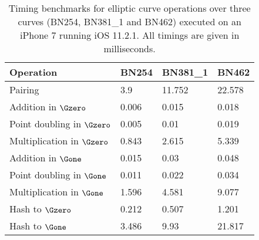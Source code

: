 
	

\begin{table}[H]
	\begin{center}
		\begin{tabular}{l||l|l|l}
		Operation            		 & BN254 & BN381\_1  & BN462  \\
		\hline
		Pairing           			 & 3.9   & 11.752 & 22.578 \\
		Addition in $\Gzero$ 		 & 0.006 & 0.015  & 0.018  \\
		Point doubling in $\Gzero$   & 0.005 & 0.01   & 0.019  \\
		Multiplication in $\Gzero$   & 0.843 & 2.615  & 5.339  \\
		Addition in $\Gone$ 		     & 0.015 & 0.03   & 0.048  \\
		Point doubling in $\Gone$    & 0.011 & 0.022  & 0.034  \\
		Multiplication in $\Gone$    & 1.596 & 4.581  & 9.077  \\
		Hash to $\Gzero$             & 0.212 & 0.507  & 1.201  \\
		Hash to $\Gone$              & 3.486 & 9.93   & 21.817 \\
		\end{tabular}
		\caption{Timing benchmarks for elliptic curve operations over three curves (BN254, BN381\_1 and BN462) executed on an iPhone 7 running iOS 11.2.1. All timings are given in milliseconds. \cite{MCLBench}}
		\label{table:benchmarks}
	\end{center}
\end{table}